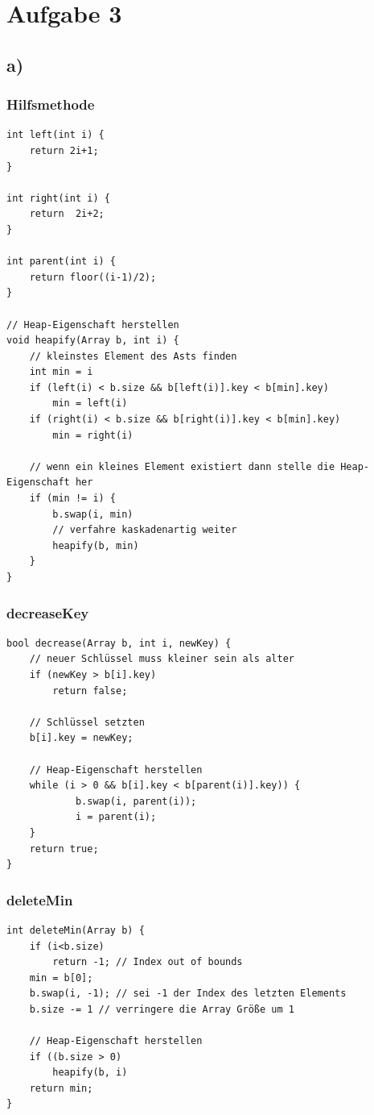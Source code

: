 \documentclass[a4paper,11pt,twoside]{scrartcl}
\begin{document}
\pagebreak

\section*{Aufgabe 3}

\subsection*{a)}

\subsubsection*{Hilfsmethode}
\begin{lstlisting}[style=c,basicstyle=\small\ttfamily]
int left(int i) {
	return 2i+1;
}

int right(int i) {
	return  2i+2;
}

int parent(int i) {
	return floor((i-1)/2);
}

// Heap-Eigenschaft herstellen
void heapify(Array b, int i) {
	// kleinstes Element des Asts finden 
	int min = i
	if (left(i) < b.size && b[left(i)].key < b[min].key)
		min = left(i)
	if (right(i) < b.size && b[right(i)].key < b[min].key)
		min = right(i)
		
	// wenn ein kleines Element existiert dann stelle die Heap-Eigenschaft her
	if (min != i) {
		b.swap(i, min)
		// verfahre kaskadenartig weiter
		heapify(b, min)
	}
}

\end{lstlisting}

\subsubsection*{decreaseKey}
\begin{lstlisting}[style=c,basicstyle=\small\ttfamily]
bool decrease(Array b, int i, newKey) {
	// neuer Schlüssel muss kleiner sein als alter
	if (newKey > b[i].key)
		return false;
	
	// Schlüssel setzten
 	b[i].key = newKey;
	
	// Heap-Eigenschaft herstellen
	while (i > 0 && b[i].key < b[parent(i)].key)) {
    		b.swap(i, parent(i));
    		i = parent(i);
	}
	return true;
}
\end{lstlisting}


\pagebreak


\subsubsection*{deleteMin}
\begin{lstlisting}[style=c,basicstyle=\small\ttfamily]
int deleteMin(Array b) {
	if (i<b.size)
		return -1; // Index out of bounds
	min = b[0];
	b.swap(i, -1); // sei -1 der Index des letzten Elements
	b.size -= 1 // verringere die Array Größe um 1

	// Heap-Eigenschaft herstellen
	if ((b.size > 0)
		heapify(b, i)
	return min;	
}
\end{lstlisting}
\end{document}
